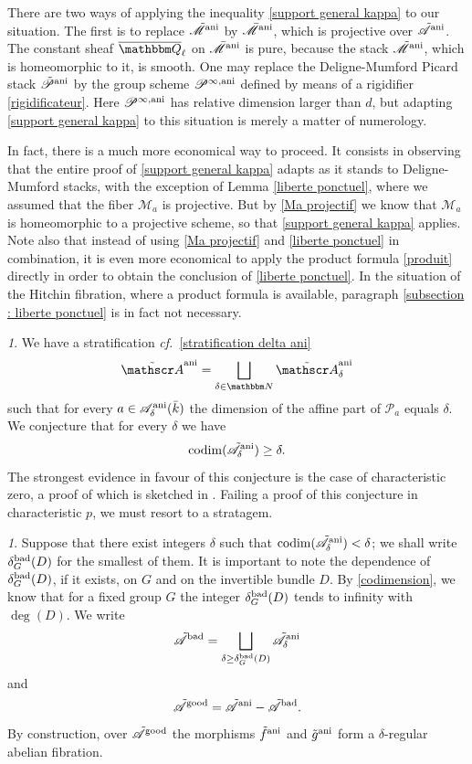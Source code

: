 \documentclass[12pt,english]{smfart}
\numberwithin{equation}{subsection}
\theoremstyle{remark}
\newtheorem{numero}[equation]{}
\newcommand\calA{{\mathscr A}}
\newcommand\calP{{\mathscr P}}
\newcommand\calM{{\mathscr M}}
\newcommand\NN{{\mathbbm N}}
\newcommand\QQ{{\mathbbm Q}}
\newcommand\cf{{\it cf.\ }}
\newcommand\ani{{\rm ani}}
\newcommand\Ql{{\overline\QQ_\ell}}
\begin{document}
There are two ways of applying the inequality \ref{support general kappa} to our situation. The first is to replace $\tilde\calM^\ani$ by $\bar\calM^\ani$, which is projective over $\tilde\calA^\ani$. The constant sheaf $\Ql$ on $\bar\calM^\ani$ is pure, because the stack $\tilde\calM^\ani$, which is homeomorphic to it, is smooth. One may replace the Deligne-Mumford Picard stack $\tilde\calP^\ani$ by the group scheme $\calP^{\infty,\ani}$ defined by means of a rigidifier \ref{rigidificateur}. Here $\calP^{\infty,\ani}$ has relative dimension larger than $d$, but adapting \ref{support general kappa} to this situation is merely a matter of numerology.

In fact, there is a much more economical way to proceed. It consists in observing that the entire proof of \ref{support general kappa} adapts as it stands to Deligne-Mumford stacks, with the exception of Lemma \ref{liberte ponctuel}, where we assumed that the fiber $\calM_a$ is projective. But by \ref{Ma projectif} we know that $\calM_a$ is homeomorphic to a projective scheme, so that \ref{support general kappa} applies. Note also that instead of using \ref{Ma projectif} and \ref{liberte ponctuel} in combination, it is even more economical to apply the product formula \ref{produit} directly in order to obtain the conclusion of \ref{liberte ponctuel}. In the situation of the Hitchin fibration, where a product formula is available, paragraph \ref{subsection : liberte ponctuel} is in fact not necessary.

\begin{numero}\label{conjecture delta regularite}
We have a stratification \cf \ref{stratification delta ani}
$$\tilde\calA^\ani=\bigsqcup_{\delta\in\NN}\tilde\calA^\ani_\delta$$
such that for every $a\in\calA^\ani_\delta(\bar k)$ the dimension of the affine part of $\calP_a$ equals $\delta$. We conjecture that for every $\delta$ we have
$${\rm codim}(\tilde\calA^\ani_\delta)\geq \delta.$$
The strongest evidence in favour of this conjecture is the case of characteristic zero, a proof of which is sketched in \cite[p.~4]{N-preparation}. Failing a proof of this conjecture in characteristic $p$, we must resort to a stratagem.
\end{numero}

\begin{numero}\label{delta bad}
Suppose that there exist integers $\delta$ such that ${\rm codim}(\tilde\calA^\ani_\delta)<\delta$; we shall write $\delta_G^{\rm bad}(D)$ for the smallest of them. It is important to note the dependence of $\delta_G^{\rm bad}(D)$, if it exists, on $G$ and on the invertible bundle $D$. By \ref{codimension}, we know that for a fixed group $G$ the integer $\delta_G^{\rm bad}(D)$ tends to infinity with $\deg(D)$. We write
$$\tilde\calA^{\rm bad}=\bigsqcup_{\delta\geq \delta_G^{\rm bad}(D)}\tilde\calA^\ani_\delta$$
and
$$\tilde\calA^{\rm good}=\tilde\calA^\ani-\tilde\calA^{\rm bad}.$$
By construction, over $\tilde\calA^{\rm good}$ the morphisms $\tilde f^\ani$ and $\tilde g^\ani$ form a $\delta$-regular abelian fibration.
\end{numero}
\end{document}
